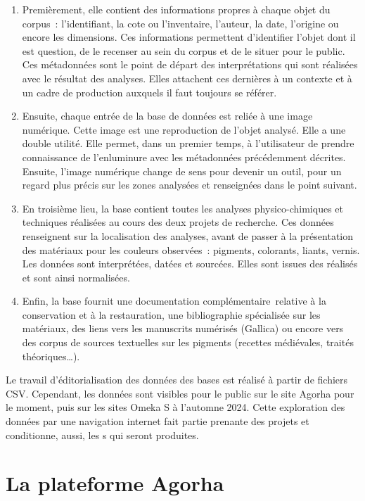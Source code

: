 \begin{enumerate}
	\item Premièrement, elle contient des informations propres à chaque objet du corpus~: l’identifiant, la cote ou l’inventaire, l’auteur, la date, l’origine ou encore les dimensions. Ces informations permettent d’identifier l’objet dont il est question, de le recenser au sein du corpus et de le situer pour le public. Ces métadonnées sont le point de départ des interprétations qui sont réalisées avec le résultat des analyses. Elles attachent ces dernières à un contexte et à un cadre de production auxquels il faut toujours se référer.
	\item Ensuite, chaque entrée de la base de données est reliée à une image numérique. Cette image est une reproduction de l’objet analysé. Elle a une double utilité. Elle permet, dans un premier temps, à l’utilisateur de prendre connaissance de l’enluminure avec les métadonnées précédemment décrites. Ensuite, l’image numérique change de sens pour devenir un outil, pour un regard plus précis sur les zones analysées et renseignées dans le point suivant.
	\item En troisième lieu, la base contient toutes les analyses physico-chimiques et techniques réalisées au cours des deux projets de recherche. Ces données renseignent sur la localisation des analyses, avant de passer à la présentation des matériaux pour les couleurs observées~: pigments, colorants, liants, vernis. Les données sont interprétées, datées et sourcées. Elles sont issues des  réalisés et sont ainsi normalisées.
	\item Enfin, la base fournit une documentation complémentaire relative à la conservation et à la restauration, une bibliographie spécialisée sur les matériaux, des liens vers les manuscrits numérisés (Gallica) ou encore vers des corpus de sources textuelles sur les pigments (recettes médiévales, traités théoriques…).
\end{enumerate} \par
Le travail d’éditorialisation des données des bases est réalisé à partir de fichiers CSV. Cependant, les données sont visibles pour le public sur le site Agorha pour le moment, puis sur les sites Omeka S à l’automne 2024. Cette exploration des données par une navigation internet fait partie prenante des projets et conditionne, aussi, les s qui seront produites. \newpage

\section{La plateforme Agorha}

